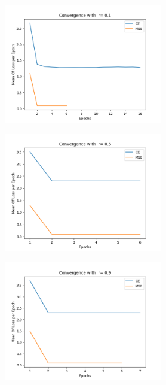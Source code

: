\documentclass[12pt,a4paper]{article}
\begin{document}
        \begin{figure}[H]
            \raggedright
                \begin{subfigure}[t]{0.5\textwidth}
                    \includegraphics[width=10cm,height=5.2cm,left]{images/0.1.png}
                \end{subfigure}
                \begin{subfigure}[t]{0.5\textwidth}
                    \includegraphics[width=10cm,height=5.2cm,left]{images/0.5.png}
                \end{subfigure}
                \begin{subfigure}[t]{0.5\textwidth}
                    \includegraphics[width=10cm,height=5.2cm,left]{images/0.9.png}
                \end{subfigure}
        \end{figure}
\end{document}
